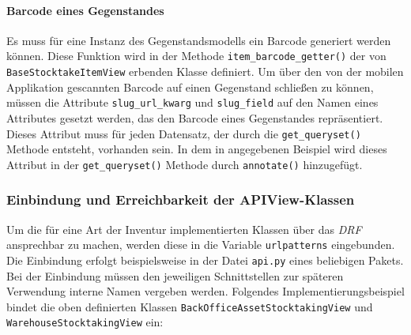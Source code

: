 \hypertarget{barcode-eines-gegenstandes}{%
\paragraph{Barcode eines
Gegenstandes}\label{barcode-eines-gegenstandes}}

Es muss für eine Instanz des Gegenstandsmodells ein Barcode generiert
werden können. Diese Funktion wird in der Methode
\texttt{item\_barcode\_getter()} der von \texttt{BaseStocktakeItemView}
erbenden Klasse definiert. Um über den von der mobilen Applikation
gescannten Barcode auf einen Gegenstand schließen zu können, müssen die
Attribute \texttt{slug\_url\_kwarg} und \texttt{slug\_field} auf den
Namen eines Attributes gesetzt werden, das den Barcode eines
Gegenstandes repräsentiert. Dieses Attribut muss für jeden Datensatz,
der durch die \texttt{get\_queryset()} Methode entsteht, vorhanden sein.
In dem in  angegebenen Beispiel wird
dieses Attribut in der \texttt{get\_queryset()} Methode durch
\texttt{annotate()} \cite{django-doku-querysets} hinzugefügt.

\hypertarget{einbindung-und-erreichbarkeit-der-apiview-klassen}{%
\subsubsection{Einbindung und Erreichbarkeit der
APIView-Klassen}\label{einbindung-und-erreichbarkeit-der-apiview-klassen}}

Um die für eine Art der Inventur implementierten Klassen über das
\emph{DRF}
ansprechbar zu machen, werden diese in die Variable \texttt{urlpatterns}
\cite{django-doku-urls} eingebunden. Die Einbindung erfolgt
beispielsweise in der Datei \texttt{api.py} eines beliebigen Pakets. Bei
der Einbindung müssen den jeweiligen Schnittstellen zur späteren
Verwendung interne Namen vergeben werden. Folgendes
Implementierungsbeispiel bindet die oben definierten Klassen
\texttt{BackOfficeAssetStocktakingView} und
\texttt{WarehouseStocktakingView} ein:

